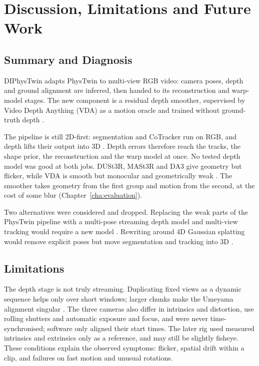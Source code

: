 \chapter{Discussion, Limitations and Future Work}\label{cha:discussion}
\label{cha:conclusion}

\section{Summary and Diagnosis}
\label{sec:disc-diagnosis}\label{sec:concl-summary}

DIPhysTwin adapts PhysTwin to multi-view RGB video: camera poses, depth and ground alignment are
inferred, then handed to its reconstruction and warp-model stages. The new component is a residual
depth smoother, supervised by Video Depth Anything (VDA) as a motion oracle and trained without
ground-truth depth \parencite{phystwin, vda}.

The pipeline is still 2D-first: segmentation and CoTracker run on RGB, and depth lifts their output
into 3D \parencite{cotracker}. Depth errors therefore reach the tracks, the shape prior, the
reconstruction and the warp model at once. No tested depth model was good at both jobs. DUSt3R,
MASt3R and DA3 give geometry but flicker, while VDA is smooth but monocular and geometrically weak
\parencite{dust3r, mast3r, da3, vda}. The smoother takes geometry from the first group and motion
from the second, at the cost of some blur (Chapter~\ref{cha:evaluation}).

Two alternatives were considered and dropped. Replacing the weak parts of the PhysTwin pipeline
with a multi-pose streaming depth model and multi-view tracking would require a new model
\parencite{dust3r, mast3r, cotracker}. Rewriting around 4D Gaussian splatting would remove explicit
poses but move segmentation and tracking into 3D \parencite{fourdgs, gaussiansplatting}.
\label{sec:disc-alternatives}

\section{Limitations}
\label{sec:disc-limitations}

The depth stage is not truly streaming. Duplicating fixed views as a dynamic sequence helps only
over short windows; larger chunks make the Umeyama alignment singular \parencite{umeyama1991}. The
three cameras also differ in intrinsics and distortion, use rolling shutters and automatic exposure
and focus, and were never time-synchronised; software only aligned their start times. The later rig
used measured intrinsics and extrinsics only as a reference, and may still be slightly fisheye. These conditions explain
the observed symptoms: flicker, spatial drift within a clip, and failures on fast motion and unusual
rotations. \label{sec:disc-streaming}\label{sec:disc-data}

